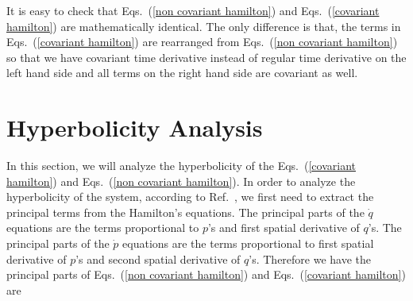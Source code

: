 \documentclass[letterpaper,nofootinbib,prd,amsmath,onecolumn]{revtex4-1}
\begin{document}
It is easy to check that Eqs.~(\ref{non covariant hamilton}) and Eqs.~(\ref{covariant hamilton}) are mathematically identical. The only difference is that, the terms in Eqs.~(\ref{covariant hamilton}) are rearranged from Eqs.~(\ref{non covariant hamilton}) so that we have covariant time derivative instead of regular time derivative on the left hand side and all terms on the right hand side are covariant as well. 
\section{Hyperbolicity Analysis}\label{hyperbolicity}
In this section, we will analyze the hyperbolicity of the Eqs.~(\ref{covariant hamilton}) and Eqs.~(\ref{non covariant hamilton}). In order to analyze the hyperbolicity of the system, according to Ref.~\cite{Brown:2008cca}, we first need to extract the principal terms from the Hamilton's equations. The principal parts of the ${\dot q}$ equations are the terms proportional to $p$'s and first spatial derivative of $q$'s. The principal parts of the ${\dot p}$ equations are the terms proportional to first spatial derivative of $p$'s and second spatial derivative of $q$'s. Therefore we have the principal parts of Eqs.~(\ref{non covariant hamilton}) and Eqs.~(\ref{covariant hamilton}) are
\end{document}
